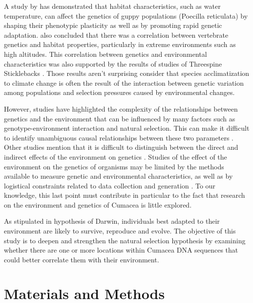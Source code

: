 A study by \cite{ghalambor_adaptive_2007} has demonstrated that habitat characteristics, such as water temperature, can affect the genetics of guppy populations (Poecilla reticulata) by shaping their phenotypic plasticity as well as by promoting rapid genetic adaptation. \cite{cheviron_genomic_2012} also concluded that there was a correlation between vertebrate genetics and habitat properties, particularly in extreme environments such as high altitudes. This correlation between genetics and environmental characteristics was also supported by the results of studies of Threespine Sticklebacks \citep{fc_genomic_2012}. Those results aren't surprising consider that species acclimatization to climate change is often the result of the interaction between genetic variation among populations and selection pressures caused by environmental changes.

However, studies have highlighted the complexity of the relationships between genetics and the environment that can be influenced by many factors such as genotype-environment interaction and natural selection. This can make it difficult to identify unambiguous causal relationships between these two parameters \citep{manel_perspectives_2010}. Other studies mention that it is difficult to distinguish between the direct and indirect effects of the environment on genetics \citep{manel_perspectives_2010, balkenhol_landscape_2019}. Studies of the effect of the environment on the genetics of organisms may be limited by the methods available to measure genetic and environmental characteristics, as well as by logistical constraints related to data collection and generation \citep{manel_perspectives_2010, shafer_widespread_2013}. To our knowledge, this last point must contribute in particular to the fact that research on the environment and genetics of Cumacea is little explored.

As stipulated in hypothesis of Darwin, individuals best adapted to their environment are likely to survive, reproduce and evolve. The objective of this study is to deepen and strengthen the natural selection hypothesis by examining whether there are one or more locations within Cumacea DNA sequences that could better correlate them with their environment.


\section{Materials and Methods}\label{materials-methods}

